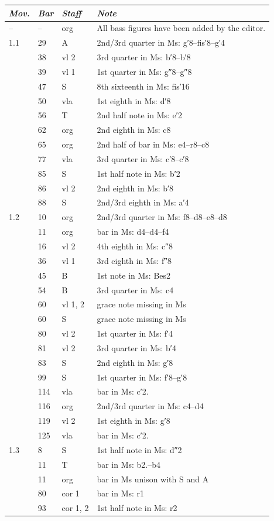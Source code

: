 \documentclass[parskip=full]{scrreprt}
\begin{document}
\bigskip

\begin{longtable}{lll L{10cm}}
	\toprule
	\itshape Mov. & \itshape Bar & \itshape Staff & \itshape Note \\
	\midrule \endhead
	–   & –   & org   & All bass figures have been added by the editor. \\
	1.1 & 29  & A     & 2nd/3rd quarter in Ms: g′8–fis′8–g′4 \\
	    & 38  & vl 2  & 3rd quarter in Ms: b′8–b′8 \\
	    & 39  & vl 1  & 1st quarter in Ms: g″8–g″8 \\
	    & 47  & S     & 8th sixteenth in Ms: fis′16 \\
	    & 50  & vla   & 1st eighth in Ms: d′8 \\
	    & 56  & T     & 2nd half note in Ms: e′2 \\
	    & 62  & org   & 2nd eighth in Ms: c8 \\
	    & 65  & org   & 2nd half of bar in Ms: e4–r8–c8 \\
	    & 77  & vla   & 3rd quarter in Ms: c′8–c′8 \\
	    & 85  & S     & 1st half note in Ms: b′2 \\
	    & 86  & vl 2  & 2nd eighth in Ms: b′8 \\
	    & 88  & S     & 2nd/3rd eighth in Ms: a′4 \\
	1.2 & 10  & org   & 2nd/3rd quarter in Ms: f8–d8–e8–d8 \\
	    & 11  & org   & bar in Ms: d4–d4–f4 \\
	    & 16  & vl 2  & 4th eighth in Ms: c″8 \\
	    & 36  & vl 1  & 3rd eighth in Ms: f″8 \\
	    & 45  & B     & 1st note in Ms: Bes2 \\
	    & 54  & B     & 3rd quarter in Ms: c4 \\
	    & 60  & vl 1, 2 & grace note missing in Ms \\
	    & 60  & S     & grace note missing in Ms \\
	    & 80  & vl 2  & 1st quarter in Ms: f′4 \\
	    & 81  & vl 2  & 3rd quarter in Ms: b′4 \\
	    & 83  & S     & 2nd eighth in Ms: g′8 \\
	    & 99  & S     & 1st quarter in Ms: f′8–g′8 \\
	    & 114 & vla   & bar in Ms: c′2. \\
	    & 116 & org   & 2nd/3rd quarter in Ms: c4–d4 \\
	    & 119 & vl 2  & 1st eighth in Ms: g′8 \\
	    & 125 & vla   & bar in Ms: c′2. \\
	1.3 & 8   & S     & 1st half note in Ms: d″2 \\
	    & 11  & T     & bar in Ms: b2.–b4 \\
	    & 11  & org   & bar in Ms unison with S and A \\
	    & 80  & cor 1 & bar in Ms: r1 \\
	    & 93  & cor 1, 2 & 1st half note in Ms: r2 \\
	\bottomrule
\end{longtable}
\end{document}
